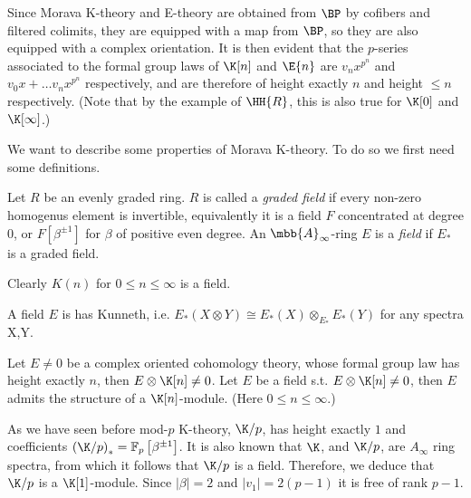 Since Morava K-theory and E-theory are obtained from $\BP$ by cofibers and filtered colimits, they are equipped with a map from $\BP$, so they are also equipped with a complex orientation.
It is then evident that the $p$-series associated to the formal group laws of $\K[n]$ and $\E{n}$ are $v_n x^{p^n}$ and $v_0 x + \dotsc v_n x^{p^n}$ respectively, and are therefore of height exactly $n$ and height $\leq n$ respectively.
(Note that by the example of $\HH{R}$, this is also true for $\K[0]$ and $\K[\infty]$.)

We want to describe some properties of Morava K-theory.
To do so we first need some definitions.

\begin{definition}
	Let $R$ be an evenly graded ring.
	$R$ is called a \emph{graded field} if every non-zero homogenus element is invertible, equivalently it is a field $F$ concentrated at degree 0, or $F\left[\beta^{\pm1}\right]$ for $\beta$ of positive even degree.
	An $\mbb{A}_\infty$-ring $E$ is a \emph{field} if $E_*$ is a graded field.
\end{definition}

\begin{example}
	Clearly $K\left(n\right)$ for $0 \leq n \leq \infty$ is a field.
\end{example}

\begin{proposition}
	A field $E$ is has Kunneth, i.e. $E_*\left(X\otimes Y\right)\cong E_*\left(X\right)\otimes_{E_*}E_*\left(Y\right)$ for any spectra X,Y.
\end{proposition}

\begin{proposition}
	Let $E \neq 0$ be a complex oriented cohomology theory, whose formal group law has height exactly $n$, then $E \otimes \K[n] \neq 0$.
	Let $E$ be a field s.t. $E \otimes \K[n] \neq 0$, then $E$ admits the structure of a $\K[n]$-module.
	(Here $0 \leq n \leq \infty$.)
\end{proposition}

\begin{example}
	As we have seen before mod-$p$ K-theory, $\K/p$, has height exactly $1$ and coefficients $\left(\K/p\right)_* = \mathbb{F}_p \left[\beta^{\pm 1}\right]$.
	It is also known that $\K$, and $\K/p$, are $A_\infty$ ring spectra, from which it follows that $\K/p$ is a field.
	Therefore, we deduce that $\K/p$ is a $\K[1]$-module.
	Since $\left|\beta\right| = 2$ and $\left|v_1\right| = 2\left(p-1\right)$ it is free of rank $p-1$.
\end{example}


